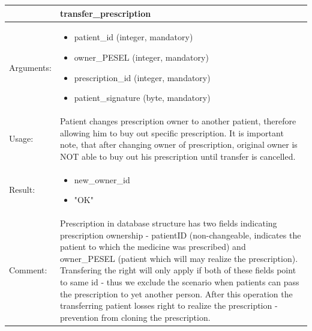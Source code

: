 
    \begin{longtable}{| p{6cm} | p{7.75cm} |}
    \hline
     & transfer\_prescription\\ \hline
    Arguments: &  \begin{itemize}
    	\item patient\_id (integer, mandatory)
    	\item owner\_PESEL (integer, mandatory)
		\item prescription\_id (integer, mandatory)
		\item patient\_signature (byte, mandatory)
	\end{itemize}     \\ \hline
    Usage: & Patient changes prescription owner to another patient, therefore allowing him to buy out specific prescription. It is important note, that after changing owner of prescription, original owner is NOT able to buy out his prescription until transfer is cancelled. \\ \hline
    Result: & \begin{itemize}
    	\item new\_owner\_id
		\item "OK"

	\end{itemize}     \\ \hline	
		Comment: & Prescription in database structure has two fields indicating prescription ownership - patientID (non-changeable, indicates the patient to which the medicine was prescribed) and owner\_PESEL (patient which will may realize the prescription).
		Transfering the right will only apply if both of these fields point to same id - thus we exclude the scenario when patients can pass the prescription to yet another person. After this operation the transferring patient losses right to realize the prescription - prevention from cloning the prescription.\\ \hline
    \end{longtable}



